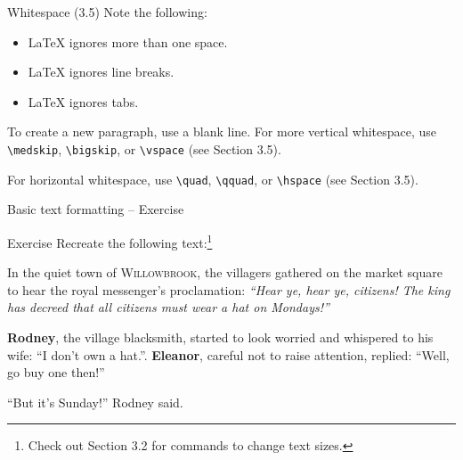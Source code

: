 \documentclass{beamer}
\newcommand{\switch}[1]{\texttt{\textbackslash#1}}
\begin{document}
\begin{frame}{Whitespace (3.5)}
    Note the following:
    \begin{itemize}
        \item \LaTeX{} ignores more than one space.
        \item \LaTeX{} ignores line breaks.
        \item \LaTeX{} ignores tabs.
    \end{itemize}

    \bigskip

    To create a new paragraph, use a blank line. For more vertical whitespace, use \switch{medskip}, \switch{bigskip}, or \switch{vspace} (see Section 3.5).

    \bigskip

    For horizontal whitespace, use \switch{quad}, \switch{qquad}, or \switch{hspace} (see Section 3.5).
\end{frame}

\begin{frame}{Basic text formatting -- Exercise}

    \begin{block}{Exercise}
        Recreate the following text:\footnote{Check out Section 3.2 for commands to change text sizes.}

        \bigskip

        \rmfamily
        \hspace{20pt}In the quiet town of \textsc{Willowbrook}, the villagers gathered on the market square to hear the royal messenger's proclamation: \textit{\Large``Hear ye, hear ye, citizens! The king has decreed that all citizens must wear a hat on Mondays!''}

        \medskip

        \hspace{20pt}\textbf{Rodney}, the village blacksmith, started to look worried and whispered to his wife: {\footnotesize``I don't own a hat.''}. \textbf{Eleanor}, careful not to raise attention, replied: {\footnotesize``Well, go buy one then!''}

        \medskip

        \hspace{20pt}``But it's Sunday!'' Rodney said.
    \end{block}
\end{frame}


\end{document}
